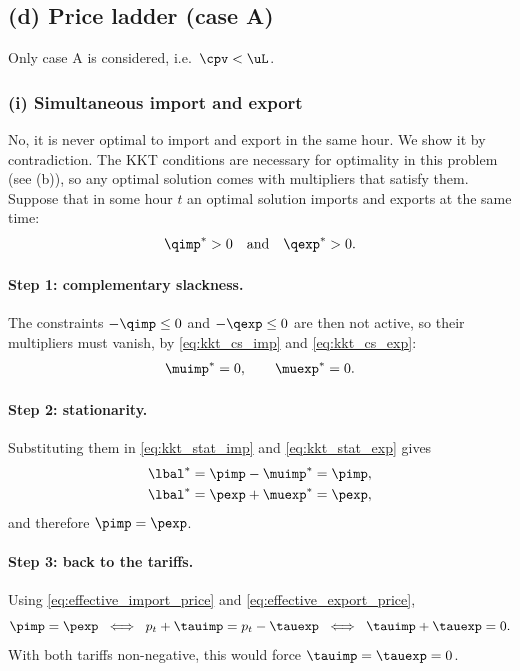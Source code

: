 \subsection{(d) Price ladder (case A)}
Only case A is considered, i.e.\ $\cpv < \uL$.

\subsubsection{(i) Simultaneous import and export}
No, it is never optimal to import and export in the same hour. We show it by contradiction.
The KKT conditions are necessary for optimality in this problem (see (b)), so any optimal
solution comes with multipliers that satisfy them. Suppose that in some hour $t$ an optimal
solution imports and exports at the same time:
\begin{equation}
    {\qimp}^* > 0 \quad \text{and} \quad {\qexp}^* > 0.
\end{equation}

\paragraph{Step 1: complementary slackness.}
The constraints $-\qimp \leq 0$ and $-\qexp \leq 0$ are then not active, so their
multipliers must vanish, by \eqref{eq:kkt_cs_imp} and \eqref{eq:kkt_cs_exp}:
\begin{equation}
    {\muimp}^* = 0, \qquad {\muexp}^* = 0.
\end{equation}

\paragraph{Step 2: stationarity.}
Substituting them in \eqref{eq:kkt_stat_imp} and \eqref{eq:kkt_stat_exp} gives
\begin{align}
    {\lbal}^* &= \pimp - {\muimp}^* = \pimp, \\
    {\lbal}^* &= \pexp + {\muexp}^* = \pexp,
\end{align}
and therefore $\pimp = \pexp$.

\paragraph{Step 3: back to the tariffs.}
Using \eqref{eq:effective_import_price} and \eqref{eq:effective_export_price},
\begin{equation}
    \pimp = \pexp
    \;\iff\; p_t + \tauimp = p_t - \tauexp
    \;\iff\; \tauimp + \tauexp = 0.
\end{equation}
With both tariffs non-negative, this would force $\tauimp = \tauexp = 0$.

